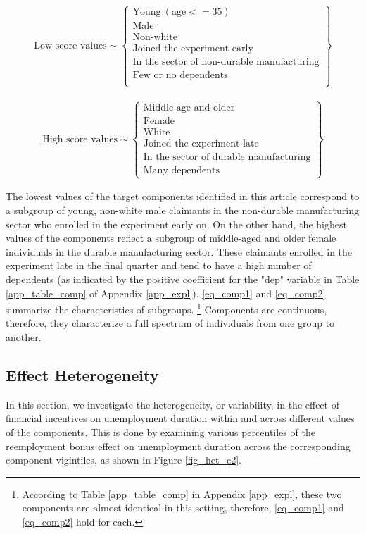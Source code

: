 \documentclass[12pt]{article}
\begin{document}
\begin{align}\label{eq_comp1}
    \text{Low score values} \sim
   \begin{Bmatrix} 
      \text{Young} \ (\text{age} <= 35) \\ 
      \text{Male} \\
      \text{Non-white}\\
        \text{Joined the experiment early}\\
      \text{In the sector of non-durable manufacturing}\\
      \text{Few or no dependents}\\
   \end{Bmatrix} 
\end{align}

\begin{align}\label{eq_comp2}
    \text{High score values} \sim
   \begin{Bmatrix} 
      \text{Middle-age and older}  \\ 
      \text{Female} \\
      \text{White}\\
        \text{Joined the experiment late}\\
      \text{In the sector of durable manufacturing}\\
      \text{Many dependents}
   \end{Bmatrix} 
   \end{align}


The lowest values of the target components identified in this article correspond to a subgroup of young, non-white male claimants in the non-durable manufacturing sector who enrolled in the experiment early on. On the other hand, the highest values of the components reflect a subgroup of middle-aged and older female individuals in the durable manufacturing sector. These claimants enrolled in the experiment late in the final quarter and tend to have a high number of dependents (as indicated by the positive coefficient for the "dep" variable in Table \ref{app_table_comp} of Appendix \ref{app_expl}).  \eqref{eq_comp1} and \eqref{eq_comp2} summarize the characteristics of subgroups. \footnote{According to Table \ref{app_table_comp} in Appendix \ref{app_expl}, these two components are almost identical in this setting, therefore, \eqref{eq_comp1} and \eqref{eq_comp2} hold for each. } Components are continuous, therefore, they characterize a full spectrum of individuals from one group to another. 


\subsection{Effect Heterogeneity}
In this section, we investigate the heterogeneity, or variability, in the effect of financial incentives on unemployment duration within and across different values of the components. This is done by examining various percentiles of the reemployment bonus effect on unemployment duration across the corresponding component vigintiles, as shown in Figure \ref{fig_het_c2}. 
\end{document}
